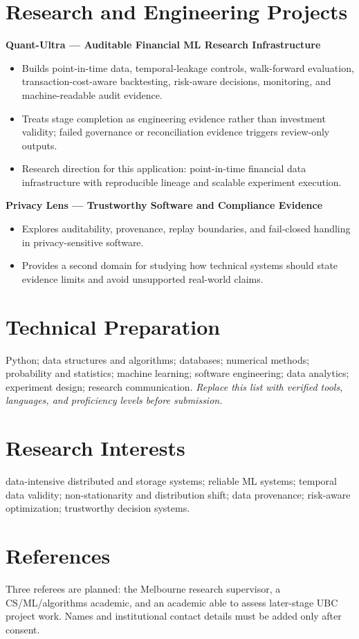 \documentclass[11pt]{article}
\begin{document}
\section*{Research and Engineering Projects}
\textbf{Quant-Ultra --- Auditable Financial ML Research Infrastructure}
\begin{itemize}
\item Builds point-in-time data, temporal-leakage controls, walk-forward evaluation, transaction-cost-aware backtesting, risk-aware decisions, monitoring, and machine-readable audit evidence.
\item Treats stage completion as engineering evidence rather than investment validity; failed governance or reconciliation evidence triggers review-only outputs.
\item Research direction for this application: point-in-time financial data infrastructure with reproducible lineage and scalable experiment execution.
\end{itemize}

\begin{samepage}
\textbf{Privacy Lens --- Trustworthy Software and Compliance Evidence}
\begin{itemize}
\item Explores auditability, provenance, replay boundaries, and fail-closed handling in privacy-sensitive software.
\item Provides a second domain for studying how technical systems should state evidence limits and avoid unsupported real-world claims.
\end{itemize}
\end{samepage}

\section*{Technical Preparation}
Python; data structures and algorithms; databases; numerical methods; probability and statistics; machine learning; software engineering; data analytics; experiment design; research communication. \textit{Replace this list with verified tools, languages, and proficiency levels before submission.}

\section*{Research Interests}
data-intensive distributed and storage systems; reliable ML systems; temporal data validity; non-stationarity and distribution shift; data provenance; risk-aware optimization; trustworthy decision systems.

\section*{References}
Three referees are planned: the Melbourne research supervisor, a CS/ML/algorithms academic, and an academic able to assess later-stage UBC project work. Names and institutional contact details must be added only after consent.
\end{document}
